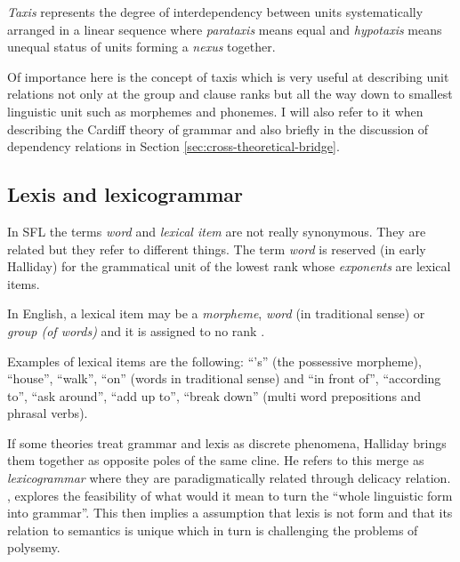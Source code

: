 \begin{definition}[Taxis]\label{def:taxis}
    \textit{Taxis} represents the degree of interdependency between units systematically arranged in a linear sequence where \textit{parataxis} means equal and \textit{hypotaxis} means unequal status of units forming a \textit{nexus} together.
\end{definition}

Of importance here is the concept of taxis which is very useful at describing unit relations not only at the group and clause ranks but all the way down to smallest linguistic unit such as morphemes and phonemes. I will also refer to it when describing the Cardiff theory of grammar and also briefly in the discussion of dependency relations in Section \ref{sec:cross-theoretical-bridge}. 

\subsection{Lexis and lexicogrammar}
In SFL the terms \textit{word} and \textit{lexical item} are not really synonymous. They are related but they refer to different things. The term \textit{word} is reserved (in early Halliday) for the grammatical unit of the lowest rank whose \textit{exponents} are lexical items. %

\begin{definition}\label{def:lexical-item}
	In English, a lexical item may be a \textit{morpheme}, \textit{word} (in traditional sense) or \textit{group (of words)} and it is assigned to no rank \citep[60]{Halliday2002}.
\end{definition}

Examples of lexical items are the following: ``'s'' (the possessive morpheme), ``house'', ``walk'', ``on'' (words in traditional sense) and ``in front of'', ``according to'', ``ask around'', ``add up to'', ``break down'' (multi word prepositions and phrasal verbs).

If some theories treat grammar and lexis as discrete phenomena, Halliday brings them together as opposite poles of the same cline. He refers to this merge as \textit{lexicogrammar} where they are paradigmatically related through delicacy relation.
\citet{Hasan2014}, explores the feasibility of what would it mean to turn the ``whole linguistic form into grammar''. This then implies a assumption that lexis is not form and that its relation to semantics is unique which  in turn is challenging the problems of polysemy. 


